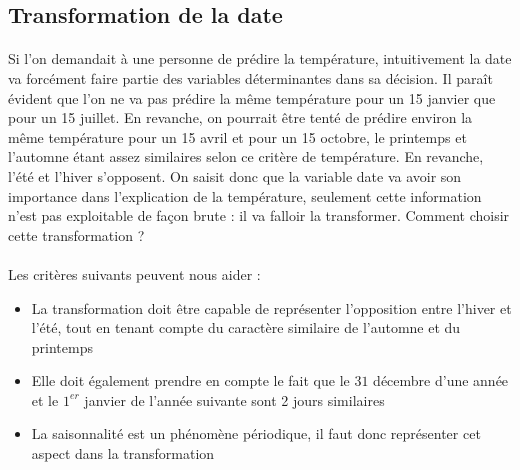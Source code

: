 \documentclass[14pt, openany]{article}
\begin{document}
\subsection{Transformation de la date}
\paragraph{}
Si l'on demandait à une personne de prédire la température, intuitivement la date va forcément faire partie des variables déterminantes dans sa décision. Il paraît évident que l'on ne va pas prédire la même température pour un 15 janvier que pour un 15 juillet. En revanche, on pourrait être tenté de prédire environ la même température pour un 15 avril et pour un 15 octobre, le printemps et l'automne étant assez similaires selon ce critère de température. En revanche, l'été et l'hiver s'opposent. On saisit donc que la variable date va avoir son importance dans l'explication de la température, seulement cette information n'est pas exploitable de façon brute : il va falloir la transformer. Comment choisir cette transformation ?\\
\paragraph{}
Les critères suivants peuvent nous aider :
\begin{itemize}
\item La transformation doit être capable de représenter l'opposition entre l'hiver et l'été, tout en tenant compte du caractère similaire de l'automne et du printemps
\item Elle doit également prendre en compte le fait que le $31$ décembre d'une année et le $1^{er}$ janvier de l'année suivante sont 2 jours similaires
\item La saisonnalité est un phénomène périodique, il faut donc représenter cet aspect dans la transformation
\end{itemize}
\end{document}
